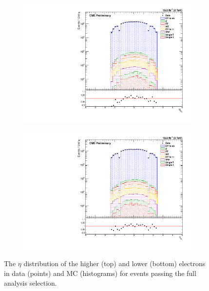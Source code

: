 \begin{figure}[!htbp]
    \vspace*{\fill}
    \centering
    \begin{subfigure}[b]{0.65\textwidth}
        \includegraphics[width=\textwidth]{figures/e0_eta.pdf}
        \caption{}
        \label{fig:e_eta_high}
    \end{subfigure}
    \begin{subfigure}[b]{0.65\textwidth}
        \includegraphics[width=\textwidth]{figures/e1_eta.pdf}
        \caption{}
        \label{fig:e_eta_low}
    \end{subfigure}
    \caption[
        The $\eta$ distribution of electrons in data.
    ]{
        The $\eta$ distribution of the higher (top) and lower (bottom) \pt
        electrons in data (points) and MC (histograms) for events passing the
        full analysis selection.
    }
    \label{fig:e_eta}
\end{figure}

